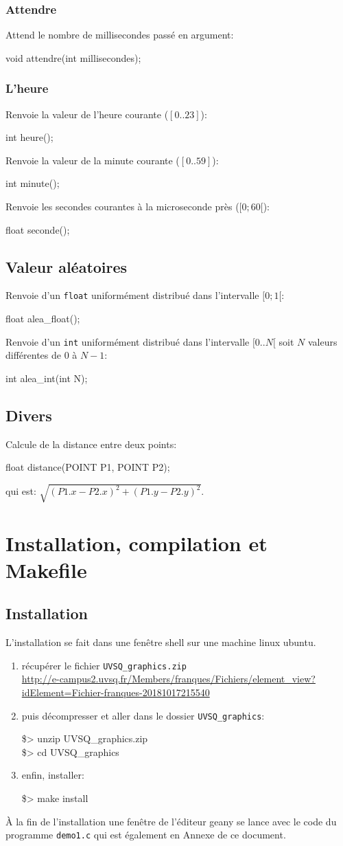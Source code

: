 \documentclass{report}
\newcommand\code[1]{
\begin{mdframed}[linecolor=purple,backgroundcolor=blue!10]
{\tt
#1
}
\end{mdframed}
}
\begin{document}
\subsection{Attendre}
Attend le nombre de millisecondes passé en argument:
\code{
void attendre(int millisecondes);
}

\subsection{L'heure}
Renvoie la valeur de l'heure courante ($[0..23]$):
\code{
int heure();
}

Renvoie la valeur de la minute courante ($[0..59]$):
\code{
int minute();
}

Renvoie les secondes courantes à la microseconde près ($[0;60[$):
\code{
float seconde();
}

\section{Valeur aléatoires}
Renvoie d'un \texttt{float} uniformément distribué dans l'intervalle $[0;1[$:
\code{
float alea\_float();
}

Renvoie d'un \texttt{int} uniformément distribué dans l'intervalle $[0..N[$
soit $N$ valeurs différentes de 0 à $N-1$:
\code{
int alea\_int(int N);
}

\section{Divers}
Calcule de la distance entre deux points:
\code{
float distance(POINT P1, POINT P2);
}
qui est: $\sqrt{(P1.x - P2.x)^2 + (P1.y - P2.y)^2 }$.

\chapter{Installation, compilation et Makefile\label{chap:inst}}
\section{Installation}
L'installation se fait dans une fenêtre shell sur une machine linux ubuntu.
\begin{enumerate}
\item récupérer le fichier \texttt{UVSQ\_graphics.zip}\\
\hspace*{-25mm}\url{http://e-campus2.uvsq.fr/Members/franques/Fichiers/element_view?idElement=Fichier-franques-20181017215540}
\item puis décompresser et aller dans le dossier \texttt{UVSQ\_graphics}:
\code{
\$> unzip UVSQ\_graphics.zip\\
\$> cd UVSQ\_graphics
}
\item enfin, installer:
\code{
\$> make install
}
\end{enumerate}
À la fin de l'installation une fenêtre de l'éditeur geany se lance avec le 
code du programme \texttt{demo1.c} qui est également en Annexe de ce document.
\end{document}
